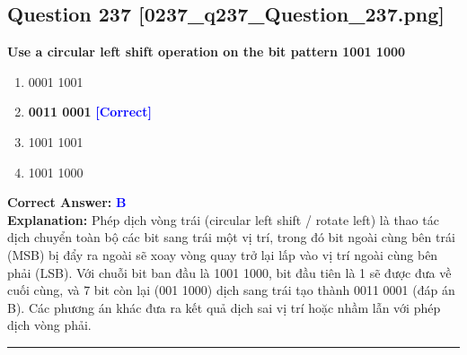 \documentclass[11pt,a4paper]{article}
\begin{document}
\begin{minipage}{\textwidth}
\subsection*{Question 237 \quad \footnotesize{[0237\_q237\_Question\_237.png]}}
\noindent \textbf{Use a circular left shift operation on the bit pattern 1001 1000}

\begin{enumerate}[label=\Alph*.]
    \item 0001 1001
    \item \textbf{0011 0001} \hfill \textcolor{blue}{\textbf{[Correct]}}
    \item 1001 1001
    \item 1001 1000
\end{enumerate}

\noindent \textbf{Correct Answer:} \textcolor{blue}{\textbf{B}} \\[2pt]
\noindent \textbf{Explanation:} Phép dịch vòng trái (circular left shift / rotate left) là thao tác dịch chuyển toàn bộ các bit sang trái một vị trí, trong đó bit ngoài cùng bên trái (MSB) bị đẩy ra ngoài sẽ xoay vòng quay trở lại lấp vào vị trí ngoài cùng bên phải (LSB). Với chuỗi bit ban đầu là 1001 1000, bit đầu tiên là 1 sẽ được đưa về cuối cùng, và 7 bit còn lại (001 1000) dịch sang trái tạo thành 0011 0001 (đáp án B). Các phương án khác đưa ra kết quả dịch sai vị trí hoặc nhầm lẫn với phép dịch vòng phải.

\par\vspace{0.3cm}
\hrule
\vspace{0.3cm}
\end{minipage}
\end{document}
